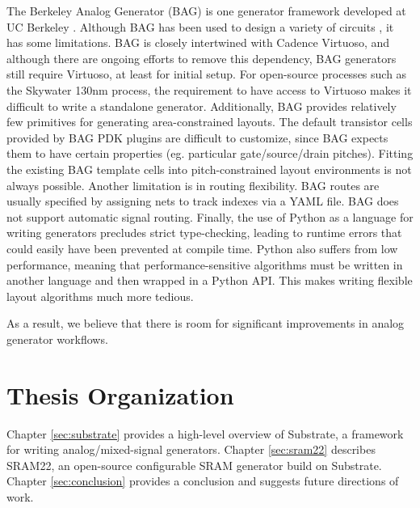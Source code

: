 The Berkeley Analog Generator (BAG) is one generator framework developed
at UC Berkeley \cite{bag}. Although BAG has been used to design a variety
of circuits \cite{serdes-gen}, it has some limitations.
BAG is closely intertwined with Cadence Virtuoso, and although there
are ongoing efforts to remove this dependency, BAG generators still require
Virtuoso, at least for initial setup. For open-source processes such as the
Skywater 130nm process, the requirement to have access to Virtuoso
makes it difficult to write a standalone generator.
Additionally, BAG provides relatively few primitives for generating
area-constrained layouts. The default transistor cells provided by BAG
PDK plugins are difficult to customize, since BAG expects them to have
certain properties (eg. particular gate/source/drain pitches). Fitting
the existing BAG template cells into pitch-constrained layout environments
is not always possible.
Another limitation is in routing flexibility. BAG routes are usually specified
by assigning nets to track indexes via a YAML file. BAG does not support
automatic signal routing.
Finally, the use of Python as a language for writing generators precludes strict type-checking,
leading to runtime errors that could easily have been prevented at compile time.
Python also suffers from low performance, meaning that performance-sensitive algorithms
must be written in another language and then wrapped in a Python API. This makes
writing flexible layout algorithms much more tedious.

As a result, we believe that there is room for significant improvements in
analog generator workflows. 

\section{Thesis Organization}

Chapter \ref{sec:substrate} provides a high-level overview of Substrate, a framework
for writing analog/mixed-signal generators.
Chapter \ref{sec:sram22} describes SRAM22, an open-source configurable SRAM generator
build on Substrate. Chapter \ref{sec:conclusion} provides a conclusion and suggests
future directions of work.
